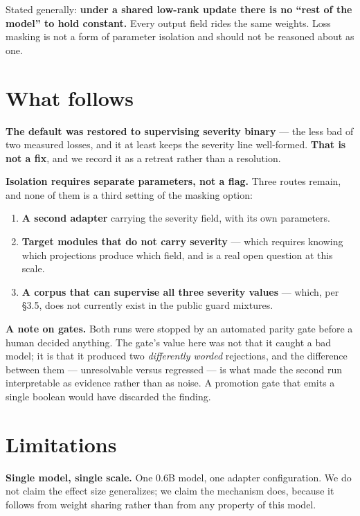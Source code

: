 \documentclass[10pt]{article}
\providecommand{\tightlist}{\setlength{\itemsep}{0pt}\setlength{\parskip}{0pt}}
\begin{document}
Stated generally: \textbf{under a shared low-rank update there is no ``rest of the model'' to hold constant.}
Every output field rides the same weights. Loss masking is not a form of parameter isolation and
should not be reasoned about as one.



\section{What follows}

\textbf{The default was restored to supervising severity binary} --- the less bad of two measured losses,
and it at least keeps the severity line well-formed. \textbf{That is not a fix}, and we record it as a
retreat rather than a resolution.

\textbf{Isolation requires separate parameters, not a flag.} Three routes remain, and none of them is a
third setting of the masking option:

\begin{enumerate}
\def\labelenumi{\arabic{enumi}.}
\tightlist
\item
  \textbf{A second adapter} carrying the severity field, with its own parameters.
\item
  \textbf{Target modules that do not carry severity} --- which requires knowing which projections produce
  which field, and is a real open question at this scale.
\item
  \textbf{A corpus that can supervise all three severity values} --- which, per §3.5, does not currently
  exist in the public guard mixtures.
\end{enumerate}

\textbf{A note on gates.} Both runs were stopped by an automated parity gate before a human decided
anything. The gate's value here was not that it caught a bad model; it is that it produced two
\emph{differently worded} rejections, and the difference between them --- unresolvable versus regressed ---
is what made the second run interpretable as evidence rather than as noise. A promotion gate that
emits a single boolean would have discarded the finding.



\section{Limitations}

\textbf{Single model, single scale.} One 0.6B model, one adapter configuration. We do not claim the effect
size generalizes; we claim the mechanism does, because it follows from weight sharing rather than
from any property of this model.
\end{document}
